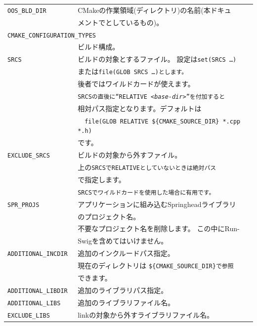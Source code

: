 \begin{narrow}[20pt]
\begin{enumerate}
		\medskip
		\def\SetRelPath{\tt{RELATIVE \$\{CMAKE\_SOURCE\_DIR\}}}
		\def\CMakeSrcDir{\tt{\$\{CMAKE\_SOURCE\_DIR\}}}
		\begin{narrow}[4pt]
		\begin{tabular}{|l|l|}\hline
		    \tt{OOS\_BLD\_DIR} &
			CMakeの作業領域(ディレクトリ)の名前(本ドキュ\\
			& メントで\build としているもの)。\\\hline
		    \multicolumn{2}{|l|}{%
			\tt{CMAKE\_CONFIGURATION\_TYPES}} \\
			& ビルド構成。\\\hline
		    \tt{SRCS} &
			ビルドの対象とするファイル。
			設定は\tt{set(SRCS …)} \\
			& または\tt{file(GLOB SRCS …)}とします。\\
			& 後者ではワイルドカードが使えます。\\
			& \tt{SRCS}の直後に``\tt{RELATIVE <\it{base-dir}>}''を付加すると \\
			& 相対パス指定となります。デフォルトは \\
			& \ \ {\footnotesize{\tt{file(GLOB \SetRelPath\ *.cpp *.h)}}} \\
			& です。\\\hline
		    \tt{EXCLUDE\_SRCS} &
			ビルドの対象から外すファイル。\\
			& 上の\tt{SRCS}で\tt{RELATIVE}としていないときは絶対パス \\
			& で指定します。\\
			& \tt{SRCS}でワイルドカードを使用した場合に有用です。\\\hline
		    \tt{SPR\_PROJS} &
			アプリケーションに組み込むSpringheadライブラリ\\
			& のプロジェクト名。\\
			& 不要なプロジェクト名を削除します。
			この中にRun-\\
			& Swigを含めてはいけません。\\\hline
		    \tt{ADDITIONAL\_INCDIR} &
			追加のインクルードパス指定。\\
			& 現在のディレクトリは \CMakeSrcDir で参照 \\
			& できます。\\\hline
		    \tt{ADDITIONAL\_LIBDIR} &
			追加のライブラリパス指定。\\\hline
		    \tt{ADDITIONAL\_LIBS} &
			追加のライブラリファイル名。\\\hline
		    \tt{EXCLUDE\_LIBS} &
			linkの対象から外すライブラリファイル名。\\

\end{tabular}
\end{narrow}
\end{enumerate}
\end{narrow}
